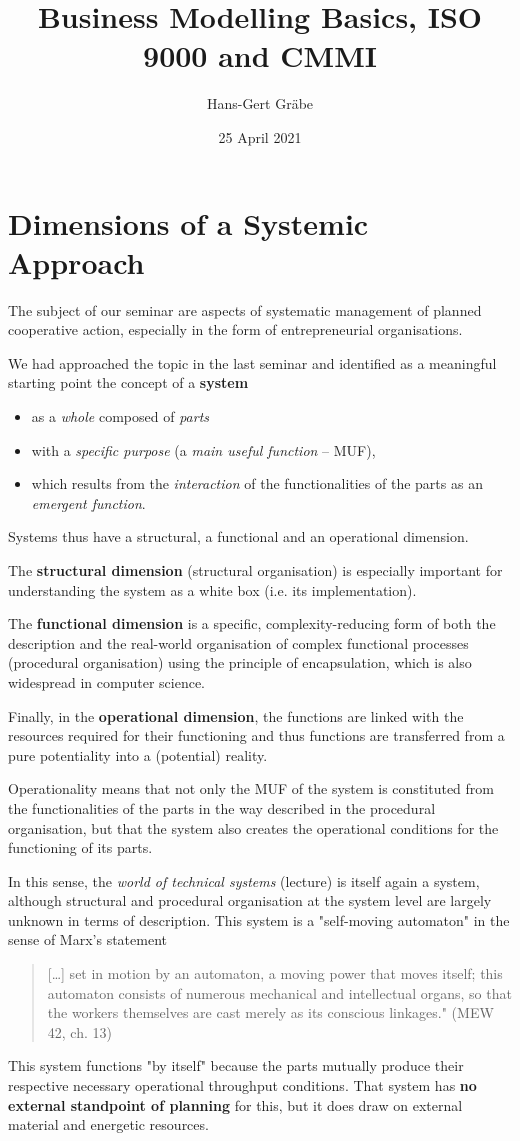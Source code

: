 \documentclass[11pt,a4paper]{article}
\title{Business Modelling Basics, ISO 9000 and CMMI}
\author{Hans-Gert Gr\"abe}
\date{25 April 2021}
\begin{document}
\maketitle

\section{Dimensions of a Systemic Approach}

The subject of our seminar are aspects of systematic management of planned
cooperative action, especially in the form of entrepreneurial organisations.

We had approached the topic in the last seminar and identified as a meaningful
starting point the concept of a \textbf{system} 
\begin{itemize}[noitemsep]
\item as a \emph{whole} composed of \emph{parts} 
\item with a \emph{specific purpose} (a \emph{main useful function} -- MUF),
\item which results from the \emph{interaction} of the functionalities of the
  parts as an \emph{emergent function}.
\end{itemize}
Systems thus have a structural, a functional and an operational dimension.

The \textbf{structural dimension} (structural organisation) is especially
important for understanding the system as a white box (i.e. its
implementation).

The \textbf{functional dimension} is a specific, complexity-reducing form of
both the description and the real-world organisation of complex functional
processes (procedural organisation) using the principle of encapsulation,
which is also widespread in computer science.

Finally, in the \textbf{operational dimension}, the functions are linked with
the resources required for their functioning and thus functions are
transferred from a pure potentiality into a (potential) reality.

Operationality means that not only the MUF of the system is constituted from
the functionalities of the parts in the way described in the procedural
organisation, but that the system also creates the operational conditions for
the functioning of its parts.

In this sense, the \emph{world of technical systems} (lecture) is itself again
a system, although structural and procedural organisation at the system level
are largely unknown in terms of description. This system is a "self-moving
automaton" in the sense of Marx's statement 
\begin{quote}
  [\ldots] set in motion by an automaton, a moving power that moves itself;
  this automaton consists of numerous mechanical and intellectual organs, so
  that the workers themselves are cast merely as its conscious linkages." (MEW
  42, ch. 13)
\end{quote}
This system functions "by itself" because the parts mutually produce their
respective necessary operational throughput conditions. That system has
\textbf{no external standpoint of planning} for this, but it does draw on
external material and energetic resources.
\end{document}
